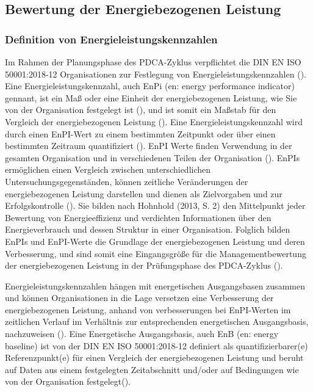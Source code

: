 \subsection{Bewertung der Energiebezogenen Leistung}
\subsubsection{Definition von Energieleistungskennzahlen}
Im Rahmen der Planungsphase des PDCA-Zyklus verpflichtet die DIN EN ISO 50001:2018-12 Organisationen zur Festlegung von Energieleistungskennzahlen 
(\cite[S. 7]{DIN50001.2018}).
Eine Energieleistungskennzahl, auch EnPi (en: energy performance indicator) gennant, ist ein Maß oder eine Einheit der energiebezogenen Leistung, wie Sie von der Organisation festgelegt ist 
(\cite[Kapitel 3.4.4]{DIN50001.2018}), und ist somit ein Maßstab für den Vergleich der energiebezogenen Leistung (\cite[Kapitel A.6.4]{DIN50001.2018}). 
Eine Energieleistungskennzahl wird durch einen EnPI-Wert zu einem bestimmten Zeitpunkt oder über einen bestimmten Zeitraum quantifiziert (\cite[Kapitel 3.4.5]{DIN50001.2018}).
EnPI Werte finden Verwendung in der gesamten Organisation und in verschiedenen Teilen der Organisation (\cite[S. 13]{DIN50006.2024}). 
EnPIs ermöglichen einen Vergleich zwischen unterschiedlichen Untersuchungsgegenständen, können zeitliche Veränderungen der energiebezogenen Leistung darstellen und dienen als 
Zielvorgaben und zur Erfolgskontrolle (\cite[S. 2]{Hohnhold.2013}).
Sie bilden nach Hohnhold (2013, S. 2) den Mittelpunkt jeder Bewertung von Energieeffizienz und verdichten Informationen über den Energieverbrauch und dessen Struktur in einer 
Organisation. 
Folglich bilden EnPIs und EnPI-Werte die Grundlage der energiebezogenen Leistung und deren Verbesserung, und sind somit eine Eingangsgröße für die Managementbewertung der energiebezogenen Leistung 
in der Prüfungsphase des PDCA-Zyklus (\cite[Kapitel 9.3.3]{DIN50001.2018}).

Energieleistungskennzahlen hängen mit energetischen Ausgangsbasen zusammen und können Organisationen in die Lage versetzen eine Verbesserung der energiebezogenen Leistung, anhand von verbesserungen bei EnPI-Werten 
im zeitlichen Verlauf im Verhältnis zur entsprechenden energetischen Ausgangsbasis, nachzuweisen (\cite[Kapitel 0.3]{DIN50001.2018}).
Eine Energetische Ausgangsbasis, auch EnB (en: energy baseline) ist von der DIN EN ISO 50001:2018-12 definiert als quantifizierbarer(e) Referenzpunkt(e) für einen Vergleich der energiebezogenen 
Leistung und beruht auf Daten aus einem festgelegten Zeitabschnitt und/oder auf Bedingungen wie von der Organisation festgelegt(\cite[Kapitel 3.4.7]{DIN50001.2018}). 

